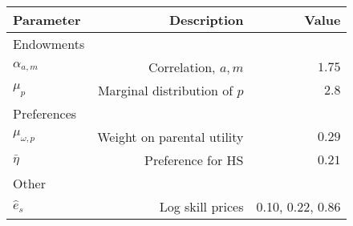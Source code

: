 \begin{tabular}{lrr}
\hline
Parameter & Description  & Value  \\
\hline
Endowments &   &   \\
$\alpha_{a,m}$ & Correlation, $a,m$  & $1.75$  \\
$\mu_{p}$ & Marginal distribution of $p$  & $2.8$  \\
Preferences &   &   \\
$\mu_{\omega,p}$ & Weight on parental utility  & $0.29$  \\
$\bar{\eta}$ & Preference for HS  & $0.21$  \\
Other &   &   \\
$\hat{e}_{s}$ & Log skill prices  & 0.10, 0.22, 0.86  \\
\hline
\end{tabular}%
